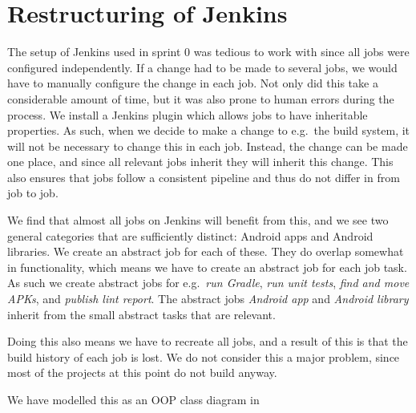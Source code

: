 



\chapter{Restructuring of Jenkins}
The setup of Jenkins used in sprint 0 was tedious to work with since all jobs were configured independently. If a change had to be made to several jobs, we would have to manually configure the change in each job. Not only did this take a considerable amount of time, but it was also prone to human errors during the process. We install a Jenkins plugin which allows jobs to have inheritable properties. As such, when we decide to make a change to e.g.\ the build system, it will not be necessary to change this in each job. Instead, the change can be made one place, and since all relevant jobs inherit they will inherit this change. This also ensures that jobs follow a consistent pipeline and thus do not differ in from job to job.

We find that almost all jobs on Jenkins will benefit from this, and we see two general categories that are sufficiently distinct: Android apps and Android libraries. We create an abstract job for each of these. They do overlap somewhat in functionality, which means we have to create an abstract job for each job task. As such we create abstract jobs for e.g.\ \emph{run Gradle}, \emph{run unit tests}, \emph{find and move APKs}, and \emph{publish lint report}. The abstract jobs \emph{Android app} and \emph{Android library} inherit from the small abstract tasks that are relevant.

Doing this also means we have to recreate all jobs, and a result of this is that the build history of each job is lost. We do not consider this a major problem, since most of the projects at this point do not build anyway.

We have modelled this as an OOP class diagram in 





